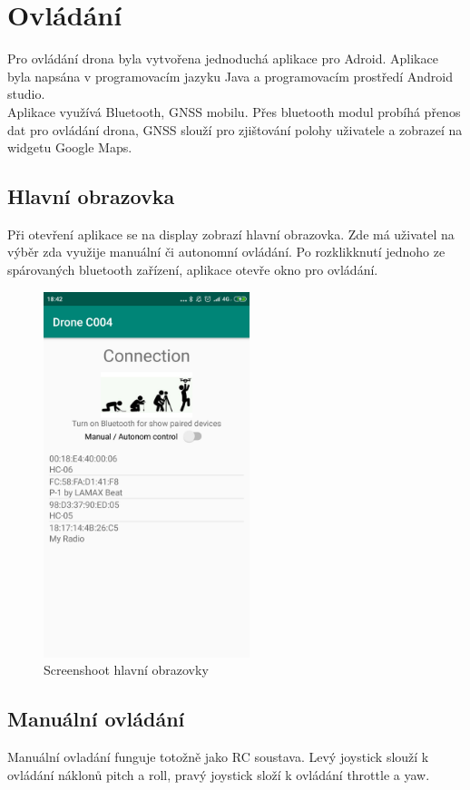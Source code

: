 \chapter{Ovládání}
\label{7-aplikace}
Pro ovládání drona byla vytvořena jednoduchá aplikace pro Adroid. Aplikace byla napsána v programovacím jazyku Java a programovacím prostředí Android studio.\\

Aplikace využívá Bluetooth, GNSS mobilu. Přes bluetooth modul probíhá přenos dat pro ovládání drona, GNSS slouží pro zjištování polohy uživatele a zobrazeí na widgetu Google Maps.\\

\section{Hlavní obrazovka}
Při otevření aplikace se na display zobrazí hlavní obrazovka. Zde má uživatel na výběr zda využije manuální či autonomní ovládání. Po rozklikknutí jednoho ze spárovaných bluetooth zařízení, aplikace otevře okno pro ovládání.\\
\begin{figure}[h]
	\centering
	\includegraphics[width=6cm]{pictures/app1.png}
	\caption{Screenshoot hlavní obrazovky}
\end{figure}

\section{Manuální ovládání} 
Manuální ovladání funguje totožně jako RC soustava. Levý joystick slouží k ovládání náklonů pitch a roll, pravý joystick složí k ovládání throttle a yaw. 

